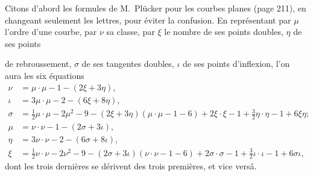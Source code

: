 \documentclass[11pt]{article}
\begin{document}
Citons d'abord les formules de M.~Pl\"ucker pour les courbes planes (page 211), en changeant seulement les lettres, pour \'eviter la confusion. En repr\'esentant par $\mu$ l'ordre d'une courbe, par $\nu$ sa classe, par $\xi$ le nombre de ses points doubles, $\eta$ de ses points

\newpage
\setcounter{page}{209}

de rebroussement, $\sigma$ de ses tangentes doubles, $\iota$ de ses points d'inflexion, l'on aura les six \'equations
\begin{align*}
\nu &= \mu\cdot\mu - 1 - (2\xi + 3\eta),\\
\iota &= 3\mu\cdot\mu - 2 - (6\xi + 8\eta),\\
\sigma &= \tfrac12 \mu\cdot\mu - 2 \mu^2 - 9 - (2\xi + 3\eta)(\mu\cdot\mu - 1 - 6) + 2\xi\cdot\xi - 1 + \tfrac32 \eta\cdot\eta - 1 + 6\xi\eta;\\
\mu &= \nu\cdot\nu - 1 - (2\sigma + 3\iota),\\
\eta &= 3\nu\cdot\nu - 2 - (6\sigma + 8\iota),\\
\xi &= \tfrac12 \nu\cdot\nu - 2 \nu^2 - 9 - (2\sigma + 3\iota)(\nu\cdot\nu - 1 - 6) + 2\sigma\cdot\sigma - 1 + \tfrac32 \iota\cdot\iota - 1 + 6\sigma\iota,
\end{align*}
dont les trois derni\`eres se d\'erivent des trois premi\`eres, et vice vers\^a.
\end{document}
